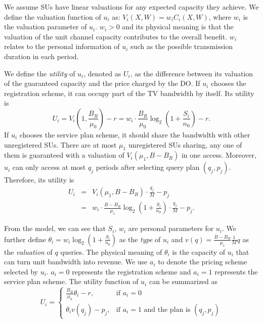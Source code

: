 \documentclass[journal]{IEEEtran}
\begin{document}
We assume SUs have linear valuations for any expected capacity they achieve. We define the valuation function of $u_i$ as:
$
V_i(X, W)=w_iC_i(X, W)
$, where $w_i$ is the valuation parameter of $u_i$. $w_i>0$ and its physical meaning is that the valuation of the unit channel capacity contributes to the overall benefit. $w_i$ relates to the personal information of $u_i$ such as the possible transmission duration in each period.

We define the \emph{utility} of $u_i$, denoted as $U_i$, as the difference between its valuation of the guaranteed capacity and the price charged by the DO. If $u_i$ chooses the registration scheme, it can occupy part of the TV bandwidth by itself. Its utility is
\begin{equation*}
U_i=V_i(1, \frac{B_R}{\mu_0})-r=w_i\cdot \frac{B_R}{\mu_0}\log_2\left(1+\frac{S_i}{n_0}\right)-r.
\end{equation*}
If $u_i$ chooses the service plan scheme, it should share the bandwidth with other unregistered SUs. There are at most $\mu_1$ unregistered SUs sharing, any one of them is guaranteed with a valuation of $V_i(\mu_1, B-B_R)$ in one access.  Moreover, $u_i$ can only access at most $q_j$ periods after selecting query plan $(q_j, p_j)$. Therefore, its utility is
\begin{eqnarray*}
U_i&=&V_i(\mu_1, B-B_R)\cdot\frac{q_j}{M}-p_j \\
&=&w_i\cdot \frac{B-B_R}{\mu_1}\log_2\left(1+\frac{S_i}{n_0}\right)\cdot \frac{q_j}{M}-p_j.
\end{eqnarray*}

From the model, we can see that $S_i$, $w_i$ are personal parameters for $u_i$. We further define $\theta_i=w_i\log_2\left(1+\frac{S_i}{n_0}\right)$ as the \emph{type} of $u_i$ and $v(q)=\frac{B-B_R}{\mu_1}\frac{1}{M}q$ as the \emph{valuation} of $q$ queries. The physical meaning of $\theta_i$ is the capacity of $u_i$ that can turn unit bandwidth into revenue. We use $a_i$ to denote the pricing scheme selected by $u_i$. $a_i=0$ represents the registration scheme and $a_i=1$ represents the service plan scheme. The utility function of $u_i$ can be summarized as
\begin{equation}
\label{equ:u_su}
U_i=\left\{
\begin{array}{ll}
\frac{B_R}{\mu_0}\theta_i-r, & \textrm{if $a_i=0$}  \\
\theta_iv(q_j)-p_j, & \textrm{if $a_i=1$ and the plan is $(q_j, p_j)$}
\end{array}
\right.
\end{equation}
\end{document}
